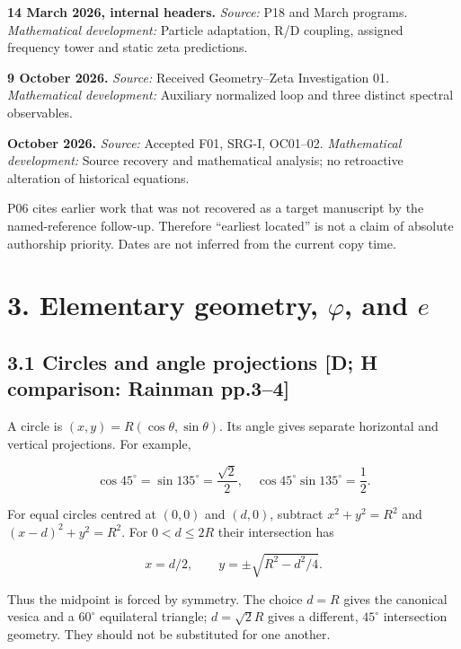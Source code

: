 \documentclass[11pt,a4paper]{article}
\begin{document}
\par\smallskip\noindent\textbf{14 March 2026, internal headers.} 
\textit{Source:} P18 and March programs. \textit{Mathematical development:} Particle adaptation, R/D coupling, assigned frequency tower and static zeta predictions.
\par\smallskip\noindent\textbf{9 October 2026.} 
\textit{Source:} Received Geometry--Zeta Investigation 01. \textit{Mathematical development:} Auxiliary normalized loop and three distinct spectral observables.
\par\smallskip\noindent\textbf{October 2026.} 
\textit{Source:} Accepted F01, SRG-I, OC01--02. \textit{Mathematical development:} Source recovery and mathematical analysis; no retroactive alteration of historical equations.

P06 cites earlier work that was not recovered as a target manuscript by the named-reference follow-up. Therefore ``earliest located'' is not a claim of absolute authorship priority. Dates are not inferred from the current copy time.


\clearpage
\section*{3. Elementary geometry, $\varphi$, and $e$}

\subsection*{3.1 Circles and angle projections [D; H comparison: Rainman pp.3--4]}

A circle is $(x,y)=R(\cos\theta,\sin\theta)$. Its angle gives separate horizontal and vertical projections. For example,


\[
\cos45^\circ=\sin135^\circ=\frac{\sqrt2}{2},
\quad \cos45^\circ\sin135^\circ=\frac12. \tag{2}
\]

For equal circles centred at $(0,0)$ and $(d,0)$, subtract
$x^2+y^2=R^2$ and $(x-d)^2+y^2=R^2$. For $0<d\leq2R$ their intersection has


\[
x=d/2,\qquad y=\pm\sqrt{R^2-d^2/4}. \tag{3}
\]

Thus the midpoint is forced by symmetry. The choice $d=R$ gives the canonical vesica and a $60^\circ$ equilateral triangle; $d=\sqrt2R$ gives a different, $45^\circ$ intersection geometry. They should not be substituted for one another.
\end{document}
